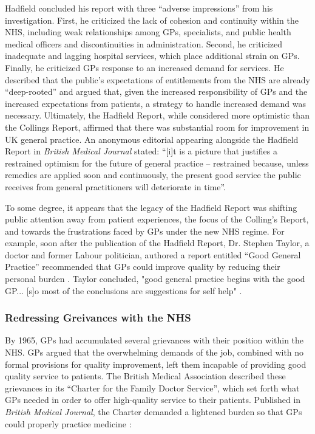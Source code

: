 \documentclass[12pt]{article}
\begin{document}
Hadfield concluded his report with three ``adverse impressions'' from his investigation. First, he criticized the lack of cohesion and continuity within the NHS, including weak relationships among GPs, specialists, and public health medical officers and discontinuities in administration. Second, he criticized inadequate and lagging hospital services, which place additional strain on GPs. Finally, he criticized GPs response to an increased demand for services. He described that the public's expectations of entitlements from the NHS are already ``deep-rooted'' and argued that, given the increased responsibility of GPs and the increased expectations from patients, a strategy to handle increased demand was necessary. Ultimately, the Hadfield Report, while considered more optimistic than the Collings Report, affirmed that there was substantial room for improvement in UK general practice. An anonymous editorial appearing alongside the Hadfield Report in \emph{British Medical Journal} stated: ``[i]t is a picture that justifies a restrained optimism for the future of general practice -- restrained because, unless remedies are applied soon and continuously, the present good service the public receives from general practitioners will deteriorate in time''.

To some degree, it appears that the legacy of the Hadfield Report was shifting public attention away from patient experiences, the focus of the Colling's Report, and towards the frustrations faced by GPs under the new NHS regime. For example, soon after the publication of the Hadfield Report, Dr. Stephen Taylor, a doctor and former Labour politician, authored a report entitled ``Good General Practice'' recommended that GPs could improve quality by reducing their personal burden \citep{taylorGoodGeneralPractice1954}. Taylor concluded, "good general practice begins with the good GP... [s]o most of the conclusions are suggestions for self help" \citep{taylorGoodGeneralPractice1954}.


\subsubsection{Redressing Greivances with the NHS}

By 1965, GPs had accumulated several grievances with their position within the NHS. GPs argued that the overwhelming demands of the job, combined with no formal provisions for quality improvement, left them incapable of providing good quality service to patients. The British Medical Association described these grievances in its ``Charter for the Family Doctor Service'', which set forth what GPs needed in order to offer high-quality service to their patients. Published in \emph{British Medical Journal}, the Charter demanded a lightened burden so that GPs could properly practice medicine \citep{gmscommitteeCharterGeneralPractice1965}:
\end{document}
